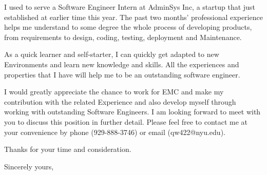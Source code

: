 \documentclass[11pt]{letter} %
\begin{document}
\begin{letter}{}
I used to serve a Software Engineer Intern at AdminSys Inc, a startup that just established at earlier time this year. The past two months’ professional experience helps me understand to some degree the whole process of developing products, from requirements to design, coding, testing, deployment and Maintenance.

As a quick learner and self-starter, I can quickly get adapted to new Environments and learn new knowledge and skills. All the experiences and properties that I have will help me to be an outstanding software engineer. 

I would greatly appreciate the chance to work for EMC and make my contribution with the related Experience and also develop myself through working with outstanding Software Engineers. I am looking forward to meet with you to discuss this position in further detail. Please feel free to contact me at your convenience by phone (929-888-3746) or email (qw422@nyu.edu).

Thanks for your time and consideration.

\closing{Sincerely yours,}




\end{letter}
\end{document}
